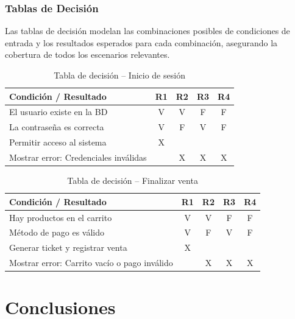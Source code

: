 \documentclass[12pt,a4paper]{report}
\begin{document}
\subsection{Tablas de Decisión}

Las tablas de decisión modelan las combinaciones posibles de condiciones de entrada y los resultados esperados para cada combinación, asegurando la cobertura de todos los escenarios relevantes.

\begin{table}[H]
\centering
\caption{Tabla de decisión -- Inicio de sesión}
\label{tab:decision_login}
\begin{tabular}{|p{5cm}|c|c|c|c|}
\hline
\textbf{Condición / Resultado} & \textbf{R1} & \textbf{R2} & \textbf{R3} & \textbf{R4} \\ \hline
El usuario existe en la BD & V & V & F & F \\ \hline
La contraseña es correcta & V & F & V & F \\ \hline
\hline
Permitir acceso al sistema & X & & & \\ \hline
Mostrar error: Credenciales inválidas & & X & X & X \\ \hline
\end{tabular}
\end{table}

\begin{table}[H]
\centering
\caption{Tabla de decisión -- Finalizar venta}
\label{tab:decision_venta}
\begin{tabular}{|p{5.5cm}|c|c|c|c|}
\hline
\textbf{Condición / Resultado} & \textbf{R1} & \textbf{R2} & \textbf{R3} & \textbf{R4} \\ \hline
Hay productos en el carrito & V & V & F & F \\ \hline
Método de pago es válido & V & F & V & F \\ \hline
\hline
Generar ticket y registrar venta & X & & & \\ \hline
Mostrar error: Carrito vacío o pago inválido & & X & X & X \\ \hline
\end{tabular}
\end{table}

\chapter{Conclusiones}
\end{document}
